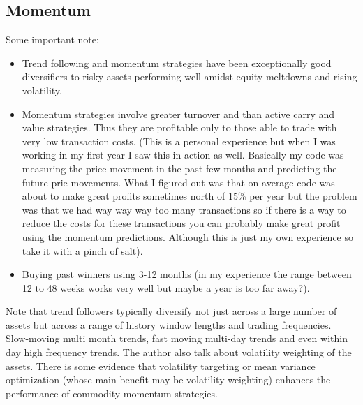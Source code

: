 \documentclass[12 pt]{article}
\begin{document}
\subsection{Momentum}
Some important note:
\begin{itemize}
\item Trend following and momentum strategies have been exceptionally good diversifiers to risky assets performing well amidst equity meltdowns and rising volatility. 
\item Momentum strategies involve greater turnover and than active carry and value strategies. Thus they are profitable only to those able to trade with very low transaction costs. (This is a personal experience but when I was working in my first year I saw this in action as well. Basically my code was measuring the price movement in the past few months and predicting the future prie movements. What I figured out was that on average code was about to make great profits sometimes north of 15\% per year but the problem was that we had way way way too many transactions so if there is a way to reduce the costs for these transactions you can probably make great profit using the momentum predictions. Although this is just my own experience so take it with a pinch of salt). 
\item Buying past winners using 3-12 months (in my experience the range between 12 to 48 weeks works very well but maybe a year is too far away?). 
\end{itemize}
Note that trend followers typically diversify not just across a large number of assets but across a range of history window lengths and trading frequencies. Slow-moving multi month trends, fast moving multi-day trends and even within day high frequency trends. The author also talk about volatility weighting of the assets. There is some evidence that volatility targeting or mean variance optimization (whose main benefit may be volatility weighting) enhances the performance of commodity momentum strategies. 
\end{document}
